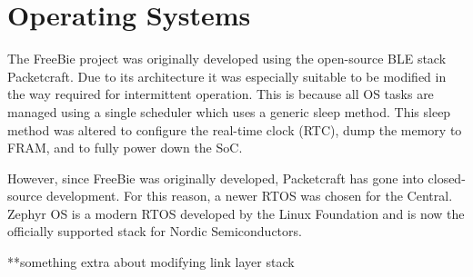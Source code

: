 \section{Operating Systems}
The FreeBie project was originally developed using the open-source BLE stack Packetcraft. Due to its architecture it was especially suitable to be modified in the way required for intermittent operation. This is because all OS tasks are managed using a single scheduler which uses a generic sleep method. This sleep method was altered to configure the real-time clock (RTC), dump the memory to FRAM, and to fully power down the SoC.

However, since FreeBie was originally developed, Packetcraft has gone into closed-source development. For this reason, a newer RTOS was chosen for the Central. Zephyr OS is a modern RTOS developed by the Linux Foundation and is now the officially supported stack for Nordic Semiconductors.

**something extra about modifying link layer stack